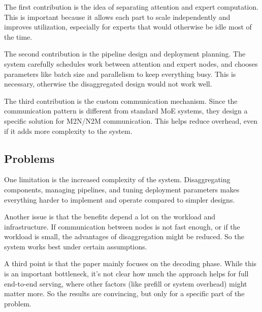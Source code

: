 \documentclass[a4paper, 12pt]{article}
\begin{document}
The first contribution is the idea of separating attention and expert computation. This is important because it allows each part to scale independently and improves utilization, especially for experts that would otherwise be idle most of the time.

The second contribution is the pipeline design and deployment planning. The system carefully schedules work between attention and expert nodes, and chooses parameters like batch size and parallelism to keep everything busy. This is necessary, otherwise the disaggregated design would not work well.

The third contribution is the custom communication mechanism. Since the communication pattern is different from standard MoE systems, they design a specific solution for M2N/N2M communication. This helps reduce overhead, even if it adds more complexity to the system.

\subsection{Problems}

One limitation is the increased complexity of the system. Disaggregating components, managing pipelines, and tuning deployment parameters makes everything harder to implement and operate compared to simpler designs.

Another issue is that the benefits depend a lot on the workload and infrastructure. If communication between nodes is not fast enough, or if the workload is small, the advantages of disaggregation might be reduced. So the system works best under certain assumptions.

A third point is that the paper mainly focuses on the decoding phase. While this is an important bottleneck, it’s not clear how much the approach helps for full end-to-end serving, where other factors (like prefill or system overhead) might matter more. So the results are convincing, but only for a specific part of the problem.
\end{document}
